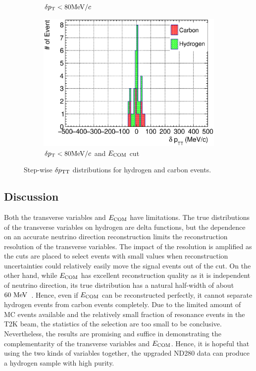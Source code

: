 \begin{figure}
\begin{subfigure}[b]{\trfigwid\textwidth}
          \caption{$\delta p_\textrm{T} < 80\textrm{MeV}/c$}
          \label{subfig:hsel-dang-dpt80}
     \end{subfigure}
     \begin{subfigure}[b]{\trfigwid\textwidth}
          \centering
          \includegraphics[width=\textwidth]{figures/perf/tki/SFGpTPCmu_dptt_stack_al15_GetH_dpt80_wdang.eps}
          \caption{$\delta p_\textrm{T} < 80\textrm{MeV}/c$ and $E_{\textrm{COM}}$ cut}
          \label{subfig:hsel-dang-dpt80-ecom}
     \end{subfigure}
     \caption{Step-wise $\delta p_\textrm{TT}$ distributions for hydrogen and carbon events.}
     \label{fig:hsel-dptt-step}
     \end{figure}

     \subsection{Discussion}
     Both the transverse variables and $E_{\textrm{COM}}$ have limitations.
     The true distributions of the transverse variables on hydrogen are delta functions, but the dependence on an accurate neutrino direction reconstruction limits the reconstruction resolution of the transverse variables.
     The impact of the resolution is amplified as the cuts are placed to select events with small values when reconstruction uncertainties could relatively easily move the signal events out of the cut.
     On the other hand, while $E_{\textrm{COM}}$ has excellent reconstruction quality as it is independent of neutrino direction, its true distribution has a natural half-width of about $60~\textrm{MeV}$~\cite{ParticleDataGroup:2024cfk}.
     Hence, even if $E_{\textrm{COM}}$ can be reconstructed perfectly, it cannot separate hydrogen events from carbon events completely.
     Due to the limited amount of MC events available and the relatively small fraction of resonance events in the T2K beam, the statistics of the selection are too small to be conclusive.
     Nevertheless, the results are promising and suffice in demonstrating the complementarity of the transverse variables and $E_{\textrm{COM}}$.
     Hence, it is hopeful that using the two kinds of variables together, the upgraded ND280 data can produce a hydrogen sample with high purity.